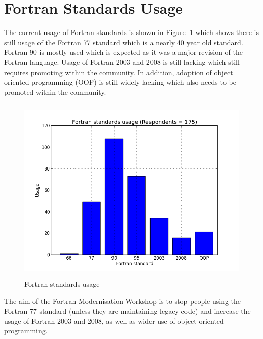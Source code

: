 \documentclass[12pt]{article}
\begin{document}
\section{Fortran Standards Usage}
The current usage of Fortran standards is shown in Figure~\ref{fortran_usage:png}
which shows there is still usage of the Fortran 77 standard which is a nearly 40 year
old standard. Fortran 90 is mostly used which is expected as it was a major revision of
the Fortran language. Usage of Fortran 2003 and 2008 is still lacking which still 
requires promoting within the community. In addition, adoption of object oriented 
programming (OOP) is still widely lacking which also needs to be promoted within the
community.  
\begin{figure}[H]
\begin{center}
\includegraphics[width=13cm,height=9cm]{fortran_usage.png}
\caption{Fortran standards usage}\label{fortran_usage:png}
\end{center}
\end{figure}
The aim of the Fortran Modernisation Workshop is to stop people using the Fortran 77 
standard (unless they are maintaining legacy code) and increase the usage of Fortran
2003 and 2008, as well as wider use of object oriented programming. 
%
\end{document}
